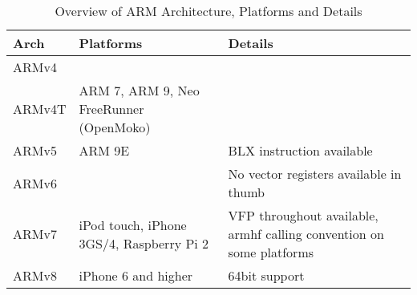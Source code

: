 
\begin{table}[h]
\begin{tabular*}{0.95\textwidth}{lll}
Arch   & Platforms & Details \\
\hline
ARMv4  & & \\
ARMv4T & ARM 7, ARM 9, Neo FreeRunner (OpenMoko) & \\
ARMv5  & ARM 9E & BLX instruction available \\
ARMv6  & & No vector registers available in thumb \\
ARMv7  & iPod touch, iPhone 3GS/4, Raspberry Pi 2 & VFP throughout available, armhf calling convention on some platforms \\
ARMv8  & iPhone 6 and higher & 64bit support \\
\end{tabular*}
\caption{Overview of ARM Architecture, Platforms and Details}
\end{table}

\newpage

